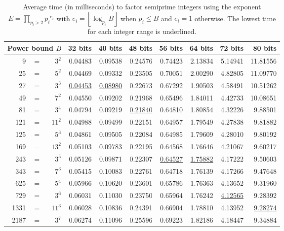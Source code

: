 \documentclass{ucalgthes1}
\theoremstyle{definition}
\newcommand{\floor}[1]{\left\lfloor #1 \right\rfloor}
\begin{document}
\begin{table}[htb]
\centering
\begin{tabular}{| r c r | r | r | r | r | r | r | r |}
	\hline
\multicolumn{3}{|r|}{Power bound $B$} & 32 bits & 40 bits & 48 bits & 56 bits & 64 bits & 72 bits & 80 bits \\
	\hline
9 & = & $3^2$ & 0.04483 & 0.09538 & 0.24576 & 0.74423 & 2.13834 & 5.14941 & 11.81556 \\
25 & = & $5^2$ & 0.04469 & 0.09332 & 0.23505 & 0.70051 & 2.00290 & 4.82805 & 11.09770 \\
27 & = & $3^3$ & \underline{0.04453} & \underline{0.08980} & 0.22673 & 0.67292 & 1.90503 & 4.58491 & 10.51262 \\
49 & = & $7^2$ & 0.04550 & 0.09202 & 0.21968 & 0.65496 & 1.84011 & 4.42733 & 10.08651 \\
81 & = & $3^4$ & 0.04794 & 0.09219 & \underline{0.21840} & 0.64810 & 1.80854 & 4.32226 & 9.88501 \\
121 & = & $11^2$ & 0.04988 & 0.09499 & 0.22151 & 0.64957 & 1.79549 & 4.27838 & 9.81882 \\
125 & = & $5^3$ & 0.04861 & 0.09505 & 0.22084 & 0.64985 & 1.79609 & 4.28010 & 9.80192 \\
169 & = & $13^2$ & 0.05103 & 0.09783 & 0.22195 & 0.64568 & 1.76646 & 4.21067 & 9.60217 \\
243 & = & $3^5$ & 0.05126 & 0.09871 & 0.22307 & \underline{0.64527} & \underline{1.75882} & 4.17222 & 9.50603 \\
343 & = & $7^3$ & 0.05415 & 0.10083 & 0.22761 & 0.64718 & 1.76139 & 4.17266 & 9.47648 \\
625 & = & $5^4$ & 0.05966 & 0.10620 & 0.23601 & 0.65786 & 1.76363 & 4.13652 & 9.31960 \\
729 & = & $3^6$ & 0.06031 & 0.11030 & 0.23750 & 0.65964 & 1.76242 & \underline{4.12565} & 9.28392 \\
1331 & = & $11^3$ & 0.06028 & 0.10836 & 0.24391 & 0.66904 & 1.78810 & 4.13952 & \underline{9.28274} \\
2187 & = & $3^7$ & 0.06274 & 0.11096 & 0.25596 & 0.69223 & 1.82186 & 4.18447 & 9.34884 \\
	\hline
\end{tabular}
\caption[Average time to factor based on power bound $B$.]{Average time (in milliseconds) to factor semiprime integers using the exponent $E = \prod_{p_i > 2} {p_i}^{e_i}$ with $e_i = \floor{\log_{p_i} B}$ when $p_i \le B$ and $e_i = 1$ otherwise.  The lowest time for each integer range is underlined.}
\label{tab:actualPrimePowerBound}
\end{table}
\end{document}
